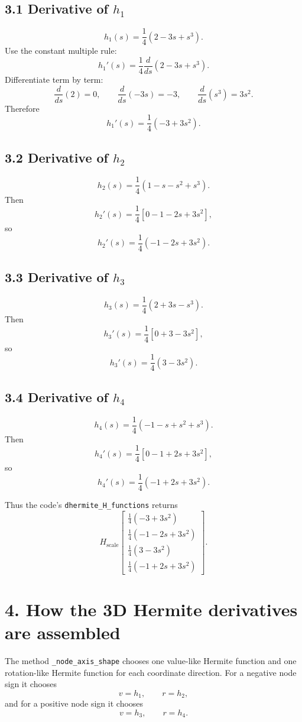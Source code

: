\documentclass[11pt]{article}
\newcommand{\od}[2]{\frac{d #1}{d #2}}
\newcommand{\Hs}{H_{\mathrm{scale}}}
\begin{document}
\subsection*{3.1 Derivative of $h_1$}

\[
h_1(s)=\frac14(2-3s+s^3).
\]
Use the constant multiple rule:
\[
h_1'(s)=
\frac14\od{}{s}(2-3s+s^3).
\]
Differentiate term by term:
\[
\od{}{s}(2)=0,\qquad
\od{}{s}(-3s)=-3,\qquad
\od{}{s}(s^3)=3s^2.
\]
Therefore
\[
\boxed{
h_1'(s)=\frac14(-3+3s^2)
}.
\]

\subsection*{3.2 Derivative of $h_2$}

\[
h_2(s)=\frac14(1-s-s^2+s^3).
\]
Then
\[
h_2'(s)=
\frac14
\left[
0-1-2s+3s^2
\right],
\]
so
\[
\boxed{
h_2'(s)=\frac14(-1-2s+3s^2)
}.
\]

\subsection*{3.3 Derivative of $h_3$}

\[
h_3(s)=\frac14(2+3s-s^3).
\]
Then
\[
h_3'(s)=
\frac14
\left[
0+3-3s^2
\right],
\]
so
\[
\boxed{
h_3'(s)=\frac14(3-3s^2)
}.
\]

\subsection*{3.4 Derivative of $h_4$}

\[
h_4(s)=\frac14(-1-s+s^2+s^3).
\]
Then
\[
h_4'(s)=
\frac14
\left[
0-1+2s+3s^2
\right],
\]
so
\[
\boxed{
h_4'(s)=\frac14(-1+2s+3s^2)
}.
\]

Thus the code's \texttt{dhermite\_H\_functions} returns
\[
\boxed{
\Hs
\begin{bmatrix}
\frac14(-3+3s^2)\\
\frac14(-1-2s+3s^2)\\
\frac14(3-3s^2)\\
\frac14(-1+2s+3s^2)
\end{bmatrix}
}.
\]

\section*{4. How the 3D Hermite derivatives are assembled}

The method \texttt{\_node\_axis\_shape} chooses one value-like Hermite function
and one rotation-like Hermite function for each coordinate direction.
For a negative node sign it chooses
\[
v=h_1,\qquad r=h_2,
\]
and for a positive node sign it chooses
\[
v=h_3,\qquad r=h_4.
\]
\end{document}
